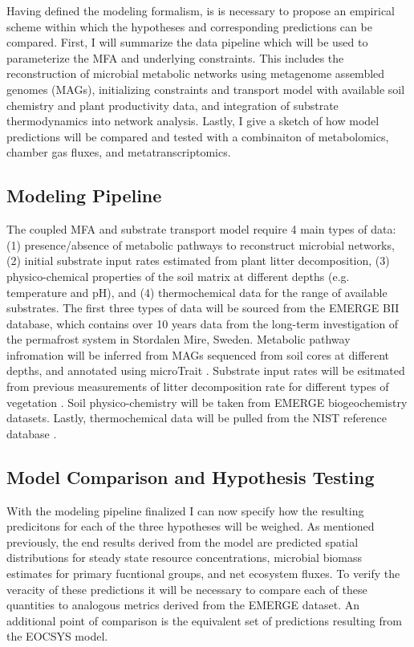 

Having defined the modeling formalism, is is necessary to propose an empirical scheme within which the hypotheses and corresponding predictions can be compared. First, I will summarize the data pipeline which will be used to parameterize the MFA and underlying constraints. This includes the reconstruction of microbial metabolic networks using metagenome assembled genomes (MAGs), initializing constraints and transport model with available soil chemistry and plant productivity data, and integration of substrate thermodynamics into network analysis. Lastly, I give a sketch of how model predictions will be compared and tested with a combinaiton of metabolomics, chamber gas fluxes, and metatranscriptomics.

\subsection{Modeling Pipeline}

The coupled MFA and substrate transport model require 4 main types of data: (1) presence/absence of metabolic pathways to reconstruct microbial networks, (2) initial substrate input rates estimated from plant litter decomposition, (3) physico-chemical properties of the soil matrix at different depths (e.g. temperature and pH), and (4) thermochemical data for the range of available substrates. The first three types of data will be sourced from the EMERGE BII database, which contains over 10 years data from the long-term investigation of the permafrost system in Stordalen Mire, Sweden. Metabolic pathway infromation will be inferred from MAGs sequenced from soil cores at different depths, and annotated using microTrait \cite{karaoz2022a}. Substrate input rates will be esitmated from previous measurements of litter decomposition rate for different types of vegetation \cite{hough2022a}. Soil physico-chemistry will be taken from EMERGE biogeochemistry datasets. Lastly, thermochemical data will be pulled from the NIST reference database \cite{p_nist_1998}.

\subsection{Model Comparison and Hypothesis Testing}

With the modeling pipeline finalized I can now specify how the resulting predicitons for each of the three hypotheses will be weighed. As mentioned previously, the end results derived from the model are predicted spatial distributions for steady state resource concentrations, microbial biomass estimates for primary fucntional groups, and net ecosystem fluxes. To verify the veracity of these predictions it will be necessary to compare each of these quantities to analogous metrics derived from the EMERGE dataset. An additional point of comparison is the equivalent set of predictions resulting from the EOCSYS model.






